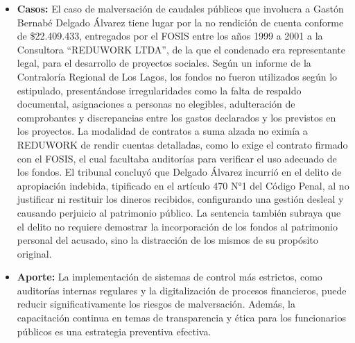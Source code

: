 \documentclass[letter,12pt]{article}
\begin{document}
\begin{itemize}
		\item \textbf{Casos: }El caso de malversación de caudales públicos que involucra a Gastón Bernabé Delgado Álvarez tiene lugar por la no rendición de cuenta conforme de \$22.409.433, entregados por el FOSIS entre los años 1999 a 2001 a la Consultora “REDUWORK LTDA”, de la que el condenado era representante legal, para el desarrollo de proyectos sociales. Según un informe de la Contraloría Regional de Los Lagos, los fondos no fueron utilizados según lo estipulado, presentándose irregularidades como la falta de respaldo documental, asignaciones a personas no elegibles, adulteración de comprobantes y discrepancias entre los gastos declarados y los previstos en los proyectos. La modalidad de contratos a suma alzada no eximía a REDUWORK de rendir cuentas detalladas, como lo exige el contrato firmado con el FOSIS, el cual facultaba auditorías para verificar el uso adecuado de los fondos. El tribunal concluyó que Delgado Álvarez incurrió en el delito de apropiación indebida, tipificado en el artículo 470 N°1 del Código Penal, al no justificar ni restituir los dineros recibidos, configurando una gestión desleal y causando perjuicio al patrimonio público. La sentencia también subraya que el delito no requiere demostrar la incorporación de los fondos al patrimonio personal del acusado, sino la distracción de los mismos de su propósito original.\cite{malversacion}\\
		
		\item \textbf{Aporte: }La implementación de sistemas de control más estrictos, como auditorías internas regulares y la digitalización de procesos financieros, puede reducir significativamente los riesgos de malversación. Además, la capacitación continua en temas de transparencia y ética para los funcionarios públicos es una estrategia preventiva efectiva.\\
	\end{itemize}
	
\end{document}

